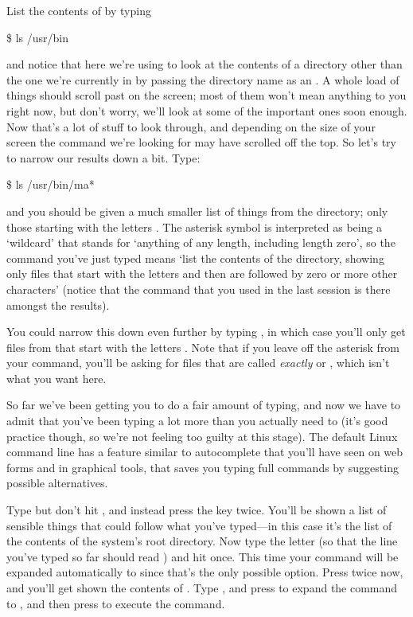 List the contents of  by typing
\begin{ttoutenv}
\$ ls /usr/bin
\end{ttoutenv}

and notice that here we're using  to look at the contents of a directory other than the one we're currently in by passing the directory name as an . A whole load of things should scroll past on the screen; most of them won't mean anything to you right now, but don't worry, we'll look at some of the important ones soon enough. Now that's a lot of stuff to look through, and depending on the size of your screen the command we're looking for may have scrolled off the top. So let's try to narrow our results down a bit. Type:

\begin{ttoutenv}
\$ ls /usr/bin/ma*
\end{ttoutenv}


and you should be given a much smaller list of things from the  directory; only those starting with the letters . The asterisk symbol is interpreted as being a `wildcard' that stands for `anything of any length, including length zero', so the command you've just typed means `list the contents of the  directory, showing only files that start with the letters  and then are followed by zero or more other characters' (notice that the  command that you used in the last session is there amongst the results). 

You could narrow this down even further by typing , in which case you'll only get files from  that start with the letters . Note that if you leave off the asterisk from your command, you'll be asking for files that are called \textit{exactly}  or , which isn't what you want here.

So far we've been getting you to do a fair amount of typing, and now we have to admit that you've been typing a lot more than you actually need to (it's good practice though, so we're not feeling too guilty at this stage). The default Linux command line has a feature similar to autocomplete that you'll have seen on web forms and in graphical tools, that saves you typing full commands by suggesting possible alternatives. 

Type  but don't hit , and instead press the  key twice. You'll be shown a list of sensible things that could follow what you've typed---in this case it's the list of the contents of the system's root directory. Now type the letter  (so that the line you've typed so far should read ) and hit  once. This time your command will be expanded automatically to  since that's the only possible option. Press  twice now, and you'll get shown the contents of . Type , and press  to expand the command to , and then press  to execute the command.

